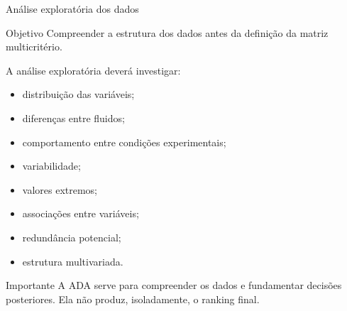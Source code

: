%
%
%
%
%
%



\begin{frame}{Análise exploratória dos dados}

    \begin{block}{Objetivo}
        Compreender a estrutura dos dados antes da definição da
        matriz multicritério.
    \end{block}

    \vspace{0.3cm}

    A análise exploratória deverá investigar:

    \begin{itemize}
        \item distribuição das variáveis;
        \item diferenças entre fluidos;
        \item comportamento entre condições experimentais;
        \item variabilidade;
        \item valores extremos;
        \item associações entre variáveis;
        \item redundância potencial;
        \item estrutura multivariada.
    \end{itemize}

    \vspace{0.2cm}

    \begin{alertblock}{Importante}
        A ADA serve para compreender os dados e fundamentar decisões
        posteriores. Ela não produz, isoladamente, o ranking final.
    \end{alertblock}

\end{frame}


